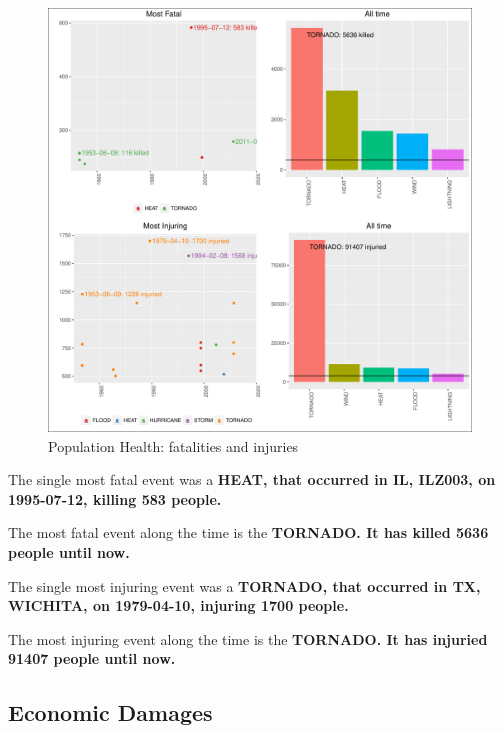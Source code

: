 \suppressfloats\begin{figure}[htbp]
\centering
\includegraphics{readme_files/figure-latex/health-plot-1.pdf}
\caption{Population Health: fatalities and injuries}
\end{figure}

The single most fatal event was a \textbf{HEAT, that occurred in IL,
ILZ003, on 1995-07-12, killing 583 people.}

The most fatal event along the time is the \textbf{TORNADO. It has
killed 5636 people until now.}

The single most injuring event was a \textbf{TORNADO, that occurred in
TX, WICHITA, on 1979-04-10, injuring 1700 people.}

The most injuring event along the time is the \textbf{TORNADO. It has
injuried 91407 people until now.}

\subsection{Economic Damages}\label{economic-damages}

